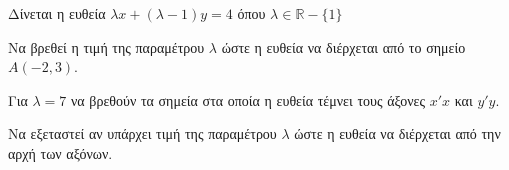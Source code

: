 Δίνεται η ευθεία $ \lambda x+(\lambda-1)y=4 $ όπου $ \lambda\in\mathbb{R}-\{1\} $ 
\begin{rlist}
\item Να βρεθεί η τιμή της παραμέτρου $ \lambda $ ώστε η ευθεία να διέρχεται από το σημείο $ A(-2,3) $.
\item Για $ \lambda=7 $ να βρεθούν τα σημεία στα οποία η ευθεία τέμνει τους άξονες $ x'x $ και $ y'y $.
\item Να εξεταστεί αν υπάρχει τιμή της παραμέτρου $ \lambda $ ώστε η ευθεία να διέρχεται από την αρχή των αξόνων.
\end{rlist}